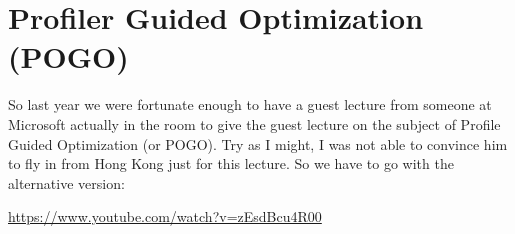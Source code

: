 




\section*{Profiler Guided Optimization (POGO)}

So last year we were fortunate enough to have a guest lecture from someone at Microsoft actually in the room to give the guest lecture on the subject of Profile Guided Optimization (or POGO). Try as I might, I was not able to convince him to fly in from Hong Kong just for this lecture. So we have to go with the alternative version:

\begin{center}
\url{https://www.youtube.com/watch?v=zEsdBcu4R00}
\end{center}



